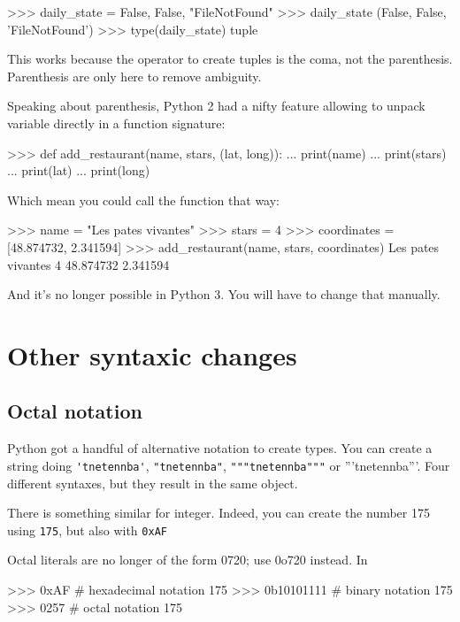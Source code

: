 \begin{py2}
\begin{py2}
\begin{py2and3}
\begin{py2and3}
\begin{py2and3}
>>> daily_state = False, False, "FileNotFound"
>>> daily_state
(False, False, 'FileNotFound')
>>> type(daily_state)
tuple
\end{py2and3}

This works because the operator to create tuples is the coma, not the parenthesis. Parenthesis are only here to remove ambiguity.

Speaking about parenthesis, Python 2 had a nifty feature allowing to unpack variable directly in a function signature:

\begin{py2}
>>> def add_restaurant(name, stars, (lat, long)):
...    print(name)
...    print(stars)
...    print(lat)
...    print(long)
\end{py2}

Which mean you could call the function that way:

\begin{py2}
>>> name = "Les pates vivantes"
>>> stars = 4
>>> coordinates = [48.874732, 2.341594]
>>> add_restaurant(name, stars, coordinates)
Les pates vivantes
4
48.874732
2.341594
\end{py2}

And it's no longer possible in Python 3. You will have to change that manually.

\section{Other syntaxic changes}

\subsection{Octal notation}

Python got a handful of alternative notation to create types. You can create a string doing \lstinline{'tnetennba'}, \lstinline{"tnetennba"}, \lstinline{"""tnetennba"""} or {'''tnetennba'''}. Four different syntaxes, but they result in the same object.

There is something similar for integer. Indeed, you can create the number 175 using \lstinline{175}, but also with \lstinline{0xAF}

Octal literals are no longer of the form 0720; use 0o720 instead. In

\begin{py2}
>>> 0xAF # hexadecimal notation
175
>>> 0b10101111 # binary notation
175
>>> 0257 # octal notation
175
\end{py2}


\end{py2and3}
\end{py2and3}
\end{py2}
\end{py2}
